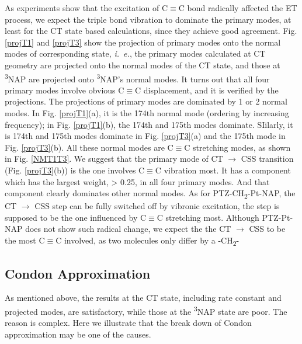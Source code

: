 As experiments show that the excitation of C$\equiv$C bond radically affected the ET process, we expect the triple bond vibration to dominate the primary modes, at least for the CT state based calculations, since they achieve good agreement. Fig. \ref{projT1} and \ref{projT3} show the projection of primary modes onto the normal modes of corresponding state, {\em i.~e.}, the primary modes calculated at CT geometry are projected onto the normal modes of the CT state, and those at \textsuperscript{3}NAP are projected onto \textsuperscript{3}NAP's normal modes. It turns out that all four primary modes involve obvious C$\equiv$C displacement, and it is verified by the projections. The projections of primary modes are dominated by 1 or 2 normal modes. In Fig. \ref{projT1}(a), it is the 174th normal mode (ordering by increasing frequency); in Fig. \ref{projT1}(b), the 174th and 175th modes dominate. SIilarly, it is 174th and 175th modes dominate in Fig. \ref{projT3}(a) and the 175th mode in Fig. \ref{projT3}(b). All these normal modes are C$\equiv$C stretching modes, as shown in Fig. \ref{NMT1T3}. We suggest that the primary mode of  CT $\rightarrow$ CSS transition (Fig. \ref{projT3}(b)) is the one involves C$\equiv$C vibration most. It has a component which has the largest weight, > 0.25, in all four primary modes. And that component clearly dominates other normal modes. As for PTZ-CH\textsubscript{2}-Pt-NAP, the CT $\rightarrow$ CSS step can be fully switched off by vibronic excitation, the step is supposed to be the one influenced by C$\equiv$C stretching most. Although PTZ-Pt-NAP does not show such radical change, we expect the the CT $\rightarrow$ CSS to be the most C$\equiv$C involved, as two molecules only differ by a -CH\textsubscript{2}-






\subsection{Condon Approximation}

As mentioned above, the results at the CT state, including rate constant and projected modes, are satisfactory, while those at the \textsuperscript{3}NAP state are poor. The reason is complex. Here we illustrate that the break down of Condon approximation may be one of the causes.


